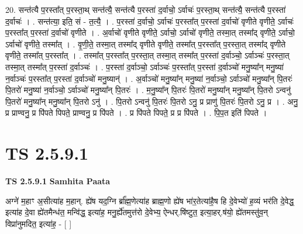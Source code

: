 \documentclass[17pt]{extarticle}
\begin{document}
20. सन्त॑त्यै प॒रस्ता᳚त् प॒रस्ता॒थ् सन्त॑त्यै॒ सन्त॑त्यै प॒रस्ता॑ द॒र्वाचो॒ ऽर्वाचः॑ प॒रस्ता॒थ् सन्त॑त्यै॒ सन्त॑त्यै प॒रस्ता॑ द॒र्वाचः॑ । . सन्त॑त्या॒ इति॒ सं - त॒त्यै॒ । . प॒रस्ता॑ द॒र्वाचो॒ ऽर्वाचः॑ प॒रस्ता᳚त् प॒रस्ता॑ द॒र्वाचो॑ वृणीते वृणीते॒ ऽर्वाचः॑ प॒रस्ता᳚त् प॒रस्ता॑ द॒र्वाचो॑ वृणीते । . अ॒र्वाचो॑ वृणीते वृणीते॒ ऽर्वाचो॒ ऽर्वाचो॑ वृणीते॒ तस्मा॒त् तस्मा᳚द् वृणीते॒ ऽर्वाचो॒ ऽर्वाचो॑ वृणीते॒ तस्मा᳚त् । . वृ॒णी॒ते॒ तस्मा॒त् तस्मा᳚द् वृणीते वृणीते॒ तस्मा᳚त् प॒रस्ता᳚त् प॒रस्ता॒त् तस्मा᳚द् वृणीते वृणीते॒ तस्मा᳚त् प॒रस्ता᳚त् । . तस्मा᳚त् प॒रस्ता᳚त् प॒रस्ता॒त् तस्मा॒त् तस्मा᳚त् प॒रस्ता॑ द॒र्वाञ्चो॒ ऽर्वाञ्चः॑ प॒रस्ता॒त् तस्मा॒त् तस्मा᳚त् प॒रस्ता॑ द॒र्वाञ्चः॑ । . प॒रस्ता॑ द॒र्वाञ्चो॒ ऽर्वाञ्चः॑ प॒रस्ता᳚त् प॒रस्ता॑ द॒र्वाञ्चो॑ मनु॒ष्या᳚न् मनु॒ष्या॑ न॒र्वाञ्चः॑ प॒रस्ता᳚त् प॒रस्ता॑ द॒र्वाञ्चो॑ मनु॒ष्यान्॑ । . अ॒र्वाञ्चो॑ मनु॒ष्या᳚न् मनु॒ष्या॑ न॒र्वाञ्चो॒ ऽर्वाञ्चो॑ मनु॒ष्या᳚न् पि॒तरः॑ पि॒तरो॑ मनु॒ष्या॑ न॒र्वाञ्चो॒ ऽर्वाञ्चो॑ मनु॒ष्या᳚न् पि॒तरः॑ । . म॒नु॒ष्या᳚न् पि॒तरः॑ पि॒तरो॑ मनु॒ष्या᳚न् मनु॒ष्या᳚न् पि॒तरो ऽन्वनु॑ पि॒तरो॑ मनु॒ष्या᳚न् मनु॒ष्या᳚न् पि॒तरो ऽनु॑ । . पि॒तरो ऽन्वनु॑ पि॒तरः॑ पि॒तरो ऽनु॒ प्र प्राणु॑ पि॒तरः॑ पि॒तरो ऽनु॒ प्र । . अनु॒ प्र प्राण्वनु॒ प्र पि॑पते पिपते॒ प्राण्वनु॒ प्र पि॑पते । . प्र पि॑पते पिपते॒ प्र प्र पि॑पते । . पि॒प॒त इति॑ पिपते । \newline
\pagebreak
{}

\section{ TS 2.5.9.1 }

\textbf{TS 2.5.9.1 } \newline
\textbf{Samhita Paata} \newline

अग्ने॑ म॒हाꣳ अ॒सीत्या॑ह म॒हान्. ह्ये॑ष यद॒ग्नि र्ब्रा᳚ह्म॒णेत्या॑ह ब्राह्म॒णो ह्ये॑ष भा॑र॒तेत्या॑है॒ष हि दे॒वेभ्यो॑ ह॒व्यं भर॑ति दे॒वेद्ध॒ इत्या॑ह दे॒वा ह्ये॑तमैन्ध॑त॒ मन्वि॑द्ध॒ इत्या॑ह॒ मनु॒र्ह्ये॑तमुत्त॑रो दे॒वेभ्य॒ ऐन्धर्.षि॑ष्टुत॒ इत्या॒हर्.ष॑यो॒ ह्ये॑तमस्तु॑व॒न् विप्रा॑नुमदित॒ इत्या॑ह॒ - [  ] \newline
\end{document}
